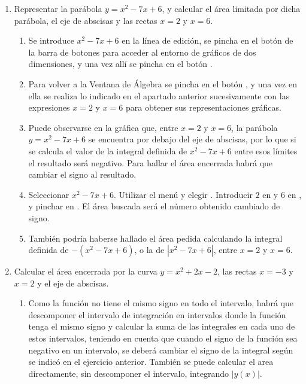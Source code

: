 \begin{enumerate}[leftmargin=*]
\item Representar la parábola $y=x^{2}-7x+6$, y calcular el área
limitada por dicha parábola, el eje de abscisas y las rectas $x=2$ y $x=6$.

\begin{indicacion}
{
\begin{enumerate}
\item Se introduce $x^{2}-7x+6$ en la línea de edición, se pincha en el botón  de la barra de botones para acceder al entorno de
gráficos de dos dimensiones, y una vez allí se pincha en el botón
.

\item Para volver a la Ventana de Álgebra se pincha en el botón
, y una vez en ella se realiza
lo indicado en el apartado anterior sucesivamente con las
expresiones $x=2$ y $x=6$ para obtener sus representaciones
gráficas.

\item Puede observarse en la gráfica que, entre $x=2$ y $x=6$,
la parábola $y=x^{2}-7x+6$ se encuentra por debajo del eje de
abscisas, por lo que si se calcula el valor de la integral definida
de $x^{2}-7x+6$ entre esos límites el resultado será negativo. Para
hallar el área encerrada habrá que cambiar el signo al resultado.

\item Seleccionar $x^{2}-7x+6$. Utilizar el menú  y elegir
. Introducir $2$ en  y $6$ en , y pinchar en
. El área buscada será el número obtenido
cambiado de signo.

\item También podría haberse hallado el área pedida calculando la integral definida de $-(x^{2}-7x+6)$, o la de
$|x^{2}-7x+6|$, entre $x=2$ y $x=6$.
\end{enumerate}
}
\end{indicacion}

\item Calcular el área encerrada por la curva $y=x^{2}+2x-2$, las rectas $x=-3$ y $x=2$ y el eje de abscisas.
\begin{indicacion}
{
\begin{enumerate}
\item Como la función no tiene el mismo signo en todo el intervalo, habrá que descomponer
 el intervalo de integración en intervalos donde la función tenga el mismo
 signo y calcular la suma de las integrales en cada uno de estos intervalos, teniendo en
cuenta que cuando el signo de la función
 sea negativo en un intervalo, se deberá cambiar el signo de la integral
 según se indicó en el ejercicio anterior. También se puede calcular el area
 directamente, sin descomponer el intervalo, integrando $|y(x)|$.


\end{enumerate}}
\end{indicacion}
\end{enumerate}

